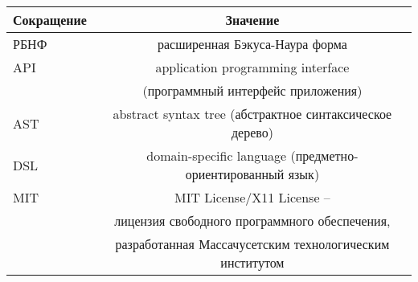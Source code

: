 \begin{table}[!ht]
    \Large
    \centering
    \begin{tabularx}{\textwidth}{|X|c|}
        \hline
        Сокращение & Значение                                                  \\
        \hline
        РБНФ       & расширенная Бэкуса-Наура форма                            \\
        \hline
        API        & application programming interface                         \\
                   & (программный интерфейс приложения)                        \\
        \hline
        AST        & abstract syntax tree (абстрактное синтаксическое дерево)  \\
        \hline
        DSL        & domain-specific language (предметно-ориентированный язык) \\
        \hline
        MIT        & MIT License/X11 License -- \\
                    & лицензия свободного программного обеспечения, \\
                    & разработанная Массачусетским технологическим институтом \\
        \hline
    \end{tabularx}
    \vspace{\bottompaddingoftable}
\end{table}